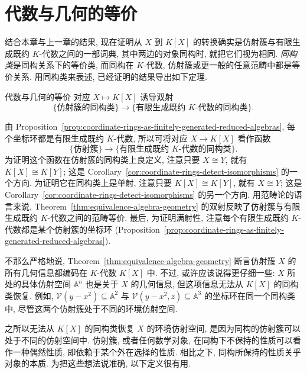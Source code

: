 \section{代数与几何的等价}\label{sec:equivalence-algebra-geometry}

结合本章与上一章的结果, 现在证明从 $X$ 到 $K[X]$ 的转换确实是仿射簇与有限生成既约 $K$-代数之间的一部词典, 其中两边的对象同构时, 就把它们视为\textquotedbl{}相同\textquotedbl{}. \emph{同构类}是同构关系下的等价类, 而同构在 $K$-代数, 仿射簇或更一般的任意范畴中都是等价关系. 用同构类来表述, 已经证明的结果导出如下定理.

\begin{Theorem}{代数与几何的等价}\leavevmode\label{thm:equivalence-algebra-geometry}
  对应 $X\mapsto K[X]$ 诱导双射
  \[
    \{\text{仿射簇的同构类}\}
     \longrightarrow
    \{\text{有限生成既约 }K\text{-代数的同构类}\}.
  \]
\end{Theorem}

\begin{Proof}
由 Proposition~\ref{prop:coordinate-rings-as-finitely-generated-reduced-algebras}, 每个坐标环都是有限生成既约 $K$-代数, 所以可将对应 $X\to K[X]$ 看作函数
\[
  \{\text{仿射簇}\}\longrightarrow
  \{\text{有限生成既约 }K\text{-代数的同构类}\}.
\]
\BookPairedNote
  {为证明这个函数在仿射簇的同构类上良定义, 注意只要 $X\cong Y$, 就有 $K[X]\cong K[Y]$; 这是 Corollary~\ref{cor:coordinate-rings-detect-isomorphisms} 的一个方向. 为证明它在同构类上是单射, 注意只要 $K[X]\cong K[Y]$, 就有 $X\cong Y$; 这是 Corollary~\ref{cor:coordinate-rings-detect-isomorphisms} 的另一个方向.}
  {用范畴论的语言来说, Theorem~\ref{thm:equivalence-algebra-geometry} 的双射反映了仿射簇与有限生成既约 $K$-代数之间的\textquotedbl{}范畴等价\textquotedbl{}.}
\noindent 最后, 为证明满射性, 注意每个有限生成既约 $K$-代数都是某个仿射簇的坐标环 (Proposition~\ref{prop:coordinate-rings-as-finitely-generated-reduced-algebras}).
\end{Proof}

不那么严格地说, Theorem~\ref{thm:equivalence-algebra-geometry} 断言仿射簇 $X$ 的所有几何信息都编码在 $K$-代数 $K[X]$ 中. 不过, 或许应该说得更仔细一些: $X$ 所处的具体仿射空间 $\mathbb{A}^{n}$ 也是关于 $X$ 的\textquotedbl{}几何信息\textquotedbl{}, 但这项信息无法从 $K[X]$ 的同构类恢复. 例如, $\mathcal{V}(y-x^{2})\subseteq\mathbb{A}^{2}$ 与 $\mathcal{V}(y-x^{2},z)\subseteq\mathbb{A}^{3}$ 的坐标环在同一个同构类中, 尽管这两个仿射簇处于不同的环境仿射空间.

之所以无法从 $K[X]$ 的同构类恢复 $X$ 的环境仿射空间, 是因为同构的仿射簇可以处于不同的仿射空间中. 仿射簇, 或者任何数学对象, 在同构下不保持的性质可以看作一种\textquotedbl{}偶然\textquotedbl{}性质, 即依赖于某个外在选择的性质. 相比之下, 同构所保持的性质关乎对象的\textquotedbl{}本质\textquotedbl{}. 为把这些想法说准确, 以下定义很有用.

